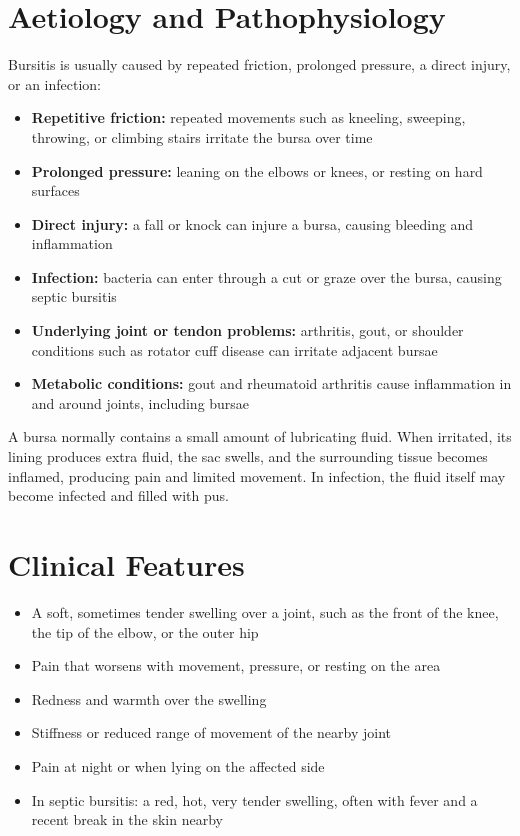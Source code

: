 \section*{Aetiology and Pathophysiology}
Bursitis is usually caused by repeated friction, prolonged pressure, a direct injury, or an infection:
\begin{itemize}
    \item \textbf{Repetitive friction:} repeated movements such as kneeling, sweeping, throwing, or climbing stairs irritate the bursa over time
    \item \textbf{Prolonged pressure:} leaning on the elbows or knees, or resting on hard surfaces
    \item \textbf{Direct injury:} a fall or knock can injure a bursa, causing bleeding and inflammation
    \item \textbf{Infection:} bacteria can enter through a cut or graze over the bursa, causing septic bursitis
    \item \textbf{Underlying joint or tendon problems:} arthritis, gout, or shoulder conditions such as rotator cuff disease can irritate adjacent bursae
    \item \textbf{Metabolic conditions:} gout and rheumatoid arthritis cause inflammation in and around joints, including bursae
\end{itemize}

A bursa normally contains a small amount of lubricating fluid. When irritated, its lining produces extra fluid, the sac swells, and the surrounding tissue becomes inflamed, producing pain and limited movement. In infection, the fluid itself may become infected and filled with pus.

\section*{Clinical Features}
\begin{itemize}
    \item A soft, sometimes tender swelling over a joint, such as the front of the knee, the tip of the elbow, or the outer hip
    \item Pain that worsens with movement, pressure, or resting on the area
    \item Redness and warmth over the swelling
    \item Stiffness or reduced range of movement of the nearby joint
    \item Pain at night or when lying on the affected side
    \item In septic bursitis: a red, hot, very tender swelling, often with fever and a recent break in the skin nearby
\end{itemize}

